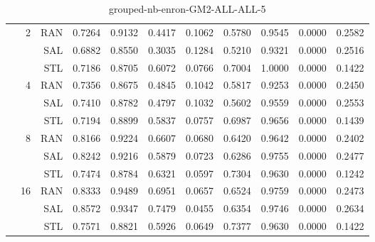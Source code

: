 \begin{center}
\begin{table}[htbp]
\begin{center}
\begin{tabular}{ | r | r | r | r | r | r | r | r | r | r | r |}
 & \multirow{3}{*}{2} & RAN & 0.7264 & 0.9132 & 0.4417 & 0.1062 & 0.5780 & 0.9545 & 0.0000 & 0.2582\\ \cline{3-11}
 &   & SAL & 0.6882 & 0.8550 & 0.3035 & 0.1284 & 0.5210 & 0.9321 & 0.0000 & 0.2516\\ \cline{3-11}
 &   & STL & 0.7186 & 0.8705 & 0.6072 & 0.0766 & 0.7004 & 1.0000 & 0.0000 & 0.1422\\ \cline{2-11}
 & \multirow{3}{*}{4} & RAN & 0.7356 & 0.8675 & 0.4845 & 0.1042 & 0.5817 & 0.9253 & 0.0000 & 0.2450\\ \cline{3-11}
 &   & SAL & 0.7410 & 0.8782 & 0.4797 & 0.1032 & 0.5602 & 0.9559 & 0.0000 & 0.2553\\ \cline{3-11}
 &   & STL & 0.7194 & 0.8899 & 0.5837 & 0.0757 & 0.6987 & 0.9656 & 0.0000 & 0.1439\\ \cline{2-11}
 & \multirow{3}{*}{8} & RAN & 0.8166 & 0.9224 & 0.6607 & 0.0680 & 0.6420 & 0.9642 & 0.0000 & 0.2402\\ \cline{3-11}
 &   & SAL & 0.8242 & 0.9216 & 0.5879 & 0.0723 & 0.6286 & 0.9755 & 0.0000 & 0.2477\\ \cline{3-11}
 &   & STL & 0.7474 & 0.8784 & 0.6321 & 0.0597 & 0.7304 & 0.9630 & 0.0000 & 0.1242\\ \cline{2-11}
 & \multirow{3}{*}{16} & RAN & 0.8333 & 0.9489 & 0.6951 & 0.0657 & 0.6524 & 0.9759 & 0.0000 & 0.2473\\ \cline{3-11}
 &   & SAL & 0.8572 & 0.9347 & 0.7479 & 0.0455 & 0.6354 & 0.9746 & 0.0000 & 0.2634\\ \cline{3-11}
 &   & STL & 0.7571 & 0.8821 & 0.5926 & 0.0649 & 0.7377 & 0.9630 & 0.0000 & 0.1422\\ \cline{2-11}
\hline
\end{tabular}
\caption{grouped-nb-enron-GM2-ALL-ALL-5}
\end{center}
 \end{table}
\end{center}

